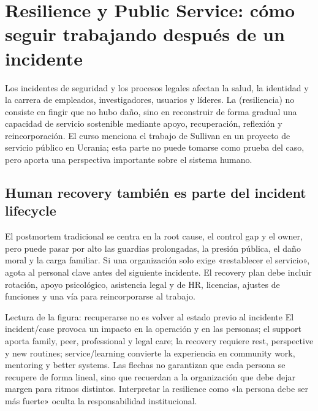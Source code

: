\section{Resilience y Public Service: cómo seguir trabajando después de un incidente}

Los incidentes de seguridad y los procesos legales afectan la salud, la identidad y la carrera de empleados, investigadores, usuarios y líderes. La  (resiliencia) no consiste en fingir que no hubo daño, sino en reconstruir de forma gradual una capacidad de servicio sostenible mediante apoyo, recuperación, reflexión y reincorporación. El curso menciona el trabajo de Sullivan en un proyecto de servicio público en Ucrania; esta parte no puede tomarse como prueba del caso, pero aporta una perspectiva importante sobre el sistema humano.

\subsection{Human recovery también es parte del incident lifecycle}

El postmortem tradicional se centra en la root cause, el control gap y el owner, pero puede pasar por alto las guardias prolongadas, la presión pública, el daño moral y la carga familiar. Si una organización solo exige «restablecer el servicio», agota al personal clave antes del siguiente incidente. El recovery plan debe incluir rotación, apoyo psicológico, asistencia legal y de HR, licencias, ajustes de funciones y una vía para reincorporarse al trabajo.


\begin{knowledgebox}{Lectura de la figura: recuperarse no es volver al estado previo al incidente}
El incident/case provoca un impacto en la operación y en las personas; el support aporta family, peer, professional y legal care; la recovery requiere rest, perspective y new routines; service/learning convierte la experiencia en community work, mentoring y better systems. Las flechas no garantizan que cada persona se recupere de forma lineal, sino que recuerdan a la organización que debe dejar margen para ritmos distintos. Interpretar la resilience como «la persona debe ser más fuerte» oculta la responsabilidad institucional.
\end{knowledgebox}

